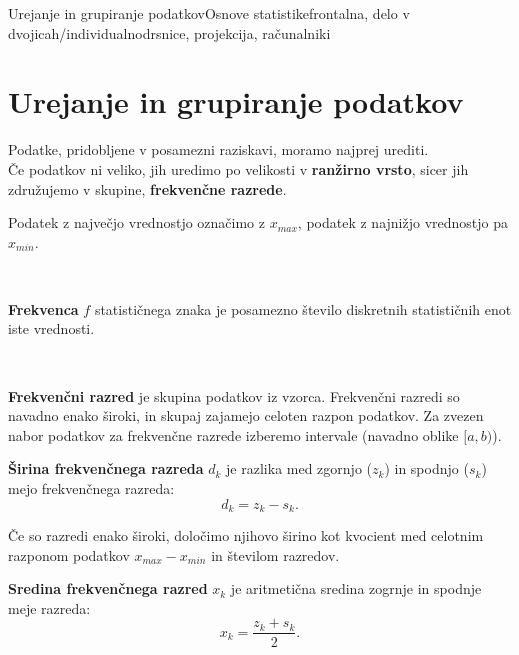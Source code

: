 \begin{priprava}{2}{}{Urejanje in grupiranje podatkov}{Osnove statistike}{frontalna, delo v dvojicah/individualno}{drsnice, projekcija, računalniki}

    \section{Urejanje in grupiranje podatkov}

        

            
                Podatke, pridobljene v posamezni raziskavi, moramo najprej urediti. \\
                Če podatkov ni veliko, jih uredimo po velikosti v \textbf{ranžirno vrsto}, sicer jih združujemo v skupine, \textbf{frekvenčne razrede}.
            

            
                Podatek z največjo vrednostjo označimo z $x_{max}$, podatek z najnižjo vrednostjo pa $x_{min}$.
            
                ~
            
                \textbf{Frekvenca} $f$ statističnega znaka je posamezno število diskretnih statističnih enot iste vrednosti.
            
                ~
            
                \textbf{Frekvenčni razred} je skupina podatkov iz vzorca. Frekvenčni razredi so navadno enako široki,
                in skupaj zajamejo celoten razpon podatkov. Za zvezen nabor podatkov za frekvenčne razrede izberemo intervale (navadno oblike $[a,b)$).
            

        

        
            
                \textbf{Širina frekvenčnega razreda} $d_k$ je razlika med zgornjo ($z_k$) in spodnjo ($s_k$) mejo frekvenčnega razreda:
                $$d_k=z_k-s_k.$$
            

            
                Če so razredi enako široki, določimo njihovo širino kot kvocient med celotnim razponom podatkov $x_{max}-x_{min}$ in številom razredov.
            

            
                \textbf{Sredina frekvenčnega razred} $x_k$ je aritmetična sredina zogrnje in spodnje meje razreda: 
                $$x_k=\dfrac{z_k+s_k}{2}.$$
            
        


\end{priprava}
